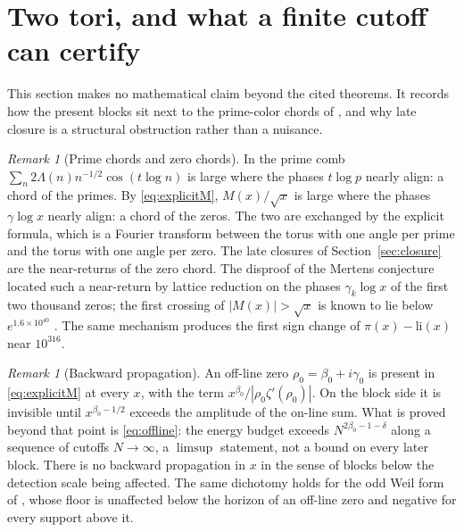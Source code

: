\documentclass[11pt]{article}
\theoremstyle{definition}
\theoremstyle{remark}
\newtheorem{remark}[theorem]{Remark}
\begin{document}
\section{Two tori, and what a finite cutoff can certify}\label{sec:tori}

This section makes no mathematical claim beyond the cited theorems. It records how the present blocks sit next to the prime-color chords of \cite{michaels-colors,michaels-folds}, and why late closure is a structural obstruction rather than a nuisance.

\begin{remark}[Prime chords and zero chords]
In \cite[\S3]{michaels-folds} the prime comb $\sum_n2\Lambda(n)n^{-1/2}\cos(t\log n)$ is large where the phases $t\log p$ nearly align: a chord of the primes. By \eqref{eq:explicitM}, $M(x)/\sqrt x$ is large where the phases $\gamma\log x$ nearly align: a chord of the zeros. The two are exchanged by the explicit formula, which is a Fourier transform between the torus with one angle per prime and the torus with one angle per zero. The late closures of Section~\ref{sec:closure} are the near-returns of the zero chord. The disproof of the Mertens conjecture \cite{odlyzko-teriele} located such a near-return by lattice reduction on the phases $\gamma_k\log x$ of the first two thousand zeros; the first crossing of $|M(x)|>\sqrt x$ is known to lie below $e^{1.6\times10^{40}}$ \cite{kotnik-teriele}. The same mechanism produces the first sign change of $\pi(x)-\mathrm{li}(x)$ near $10^{316}$.
\end{remark}

\begin{remark}[Backward propagation]
An off-line zero $\rho_0=\beta_0+i\gamma_0$ is present in \eqref{eq:explicitM} at every $x$, with the term $x^{\beta_0}/|\rho_0\zeta'(\rho_0)|$. On the block side it is invisible until $x^{\beta_0-1/2}$ exceeds the amplitude of the on-line sum. What is proved beyond that point is \eqref{eq:offline}: the energy budget exceeds $N^{2\beta_0-1-\delta}$ along a sequence of cutoffs $N\to\infty$, a $\limsup$ statement, not a bound on every later block. There is no backward propagation in $x$ in the sense of blocks below the detection scale being affected. The same dichotomy holds for the odd Weil form of \cite[\S12]{michaels-folds}, whose floor is unaffected below the horizon of an off-line zero and negative for every support above it.
\end{remark}
\end{document}
